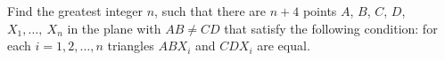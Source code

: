 Find the greatest integer $n$, such that there are $n+4$ points $A$, $B$, $C$, $D$, $X_1,\dots,~X_n$ in the plane with $AB\ne CD$ that satisfy the following condition: for each $i=1,2,\dots,n$ triangles $ABX_i$ and $CDX_i$ are equal.